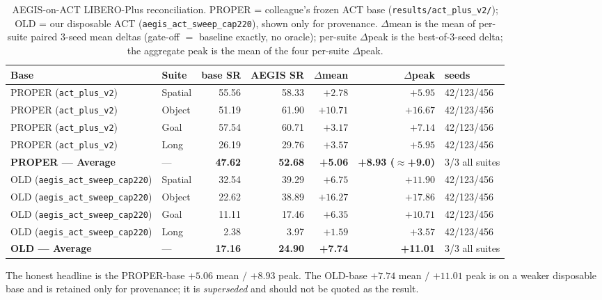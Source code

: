 \begin{table}[h]
\centering
\caption{AEGIS-on-ACT LIBERO-Plus reconciliation. PROPER = colleague's frozen ACT
base (\texttt{results/act\_plus\_v2/}); OLD = our disposable ACT
(\texttt{aegis\_act\_sweep\_cap220}), shown only for provenance. $\Delta$mean is
the mean of per-suite paired 3-seed mean deltas (gate-off $=$ baseline exactly,
no oracle); per-suite $\Delta$peak is the best-of-3-seed delta; the aggregate
peak is the mean of the four per-suite $\Delta$peak.}
\label{tab:act-reconcile}
\begin{tabular}{llrrrrl}
\hline
Base & Suite & base SR & AEGIS SR & $\Delta$mean & $\Delta$peak & seeds \\
\hline
PROPER (\texttt{act\_plus\_v2}) & Spatial & 55.56 & 58.33 & $+2.78$ & $+5.95$ & 42/123/456 \\
PROPER (\texttt{act\_plus\_v2}) & Object  & 51.19 & 61.90 & $+10.71$ & $+16.67$ & 42/123/456 \\
PROPER (\texttt{act\_plus\_v2}) & Goal    & 57.54 & 60.71 & $+3.17$ & $+7.14$ & 42/123/456 \\
PROPER (\texttt{act\_plus\_v2}) & Long    & 26.19 & 29.76 & $+3.57$ & $+5.95$ & 42/123/456 \\
\textbf{PROPER --- Average} & --- & \textbf{47.62} & \textbf{52.68} & \textbf{+5.06} & \textbf{+8.93 ($\approx$+9.0)} & 3/3 all suites \\
\hline
OLD (\texttt{aegis\_act\_sweep\_cap220}) & Spatial & 32.54 & 39.29 & $+6.75$ & $+11.90$ & 42/123/456 \\
OLD (\texttt{aegis\_act\_sweep\_cap220}) & Object  & 22.62 & 38.89 & $+16.27$ & $+17.86$ & 42/123/456 \\
OLD (\texttt{aegis\_act\_sweep\_cap220}) & Goal    & 11.11 & 17.46 & $+6.35$ & $+10.71$ & 42/123/456 \\
OLD (\texttt{aegis\_act\_sweep\_cap220}) & Long    & 2.38 & 3.97 & $+1.59$ & $+3.57$ & 42/123/456 \\
\textbf{OLD --- Average} & --- & \textbf{17.16} & \textbf{24.90} & \textbf{+7.74} & \textbf{+11.01} & 3/3 all suites \\
\hline
\end{tabular}
\end{table}

\noindent The honest headline is the PROPER-base $+5.06$ mean $/$ $+8.93$ peak.
The OLD-base $+7.74$ mean $/$ $+11.01$ peak is on a weaker disposable base and is
retained only for provenance; it is \emph{superseded} and should not be quoted as
the result.

